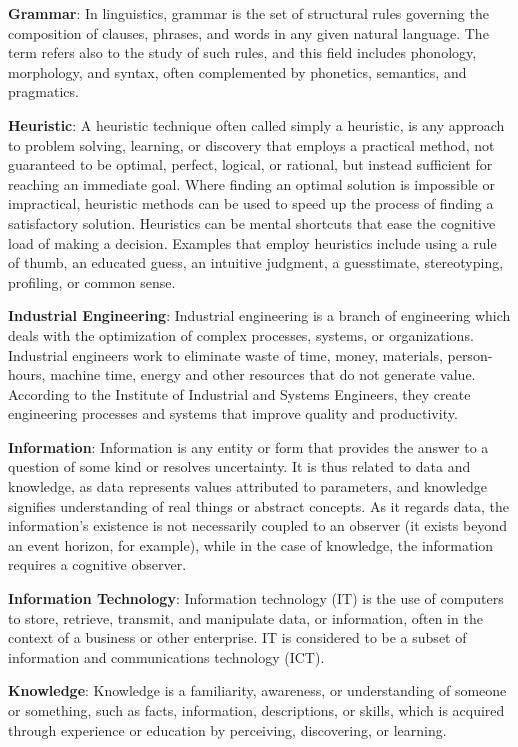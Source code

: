 \documentclass[]{book}
\theoremstyle{definition}
\theoremstyle{definition}
\theoremstyle{definition}
\theoremstyle{remark}
\begin{document}
\textbf{Grammar}: In linguistics, grammar is the set of structural rules
governing the composition of clauses, phrases, and words in any given
natural language. The term refers also to the study of such rules, and
this field includes phonology, morphology, and syntax, often
complemented by phonetics, semantics, and pragmatics.

\textbf{Heuristic}: A heuristic technique often called simply a
heuristic, is any approach to problem solving, learning, or discovery
that employs a practical method, not guaranteed to be optimal, perfect,
logical, or rational, but instead sufficient for reaching an immediate
goal. Where finding an optimal solution is impossible or impractical,
heuristic methods can be used to speed up the process of finding a
satisfactory solution. Heuristics can be mental shortcuts that ease the
cognitive load of making a decision. Examples that employ heuristics
include using a rule of thumb, an educated guess, an intuitive judgment,
a guesstimate, stereotyping, profiling, or common sense.

\textbf{Industrial Engineering}: Industrial engineering is a branch of
engineering which deals with the optimization of complex processes,
systems, or organizations. Industrial engineers work to eliminate waste
of time, money, materials, person-hours, machine time, energy and other
resources that do not generate value. According to the Institute of
Industrial and Systems Engineers, they create engineering processes and
systems that improve quality and productivity.

\textbf{Information}: Information is any entity or form that provides
the answer to a question of some kind or resolves uncertainty. It is
thus related to data and knowledge, as data represents values attributed
to parameters, and knowledge signifies understanding of real things or
abstract concepts. As it regards data, the information's existence is
not necessarily coupled to an observer (it exists beyond an event
horizon, for example), while in the case of knowledge, the information
requires a cognitive observer.

\textbf{Information Technology}: Information technology (IT) is the use
of computers to store, retrieve, transmit, and manipulate data, or
information, often in the context of a business or other enterprise. IT
is considered to be a subset of information and communications
technology (ICT).

\textbf{Knowledge}: Knowledge is a familiarity, awareness, or
understanding of someone or something, such as facts, information,
descriptions, or skills, which is acquired through experience or
education by perceiving, discovering, or learning.
\end{document}
